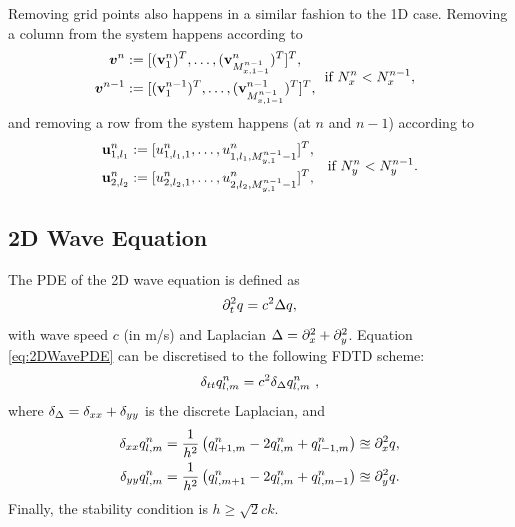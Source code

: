 \documentclass[fleqn]{jaes}
\begin{document}
Removing grid points also happens in a similar fashion to the 1D case. Removing a column from the system happens according to 
\begin{equation}
\begin{aligned}
    \!\!\!\!\vv^n &:= [(\v_1^n)^T, \hdots, (\v_{M_{x,1-1}^{n-1}}^n)^T]^T,\\
     \!\!\!\!\vv^{n-1} &:= [(\v_1^{n-1})^T, \hdots, (\v_{M_{x,1-1}^{n-1}}^{n-1})^T]^T,
    \end{aligned}
\ \ \text{if } N_x^n < N_x^{n-1},
\end{equation}
and removing a row from the system happens (at $n$ and $n-1$) according to
\begin{equation}
    \begin{aligned}
        \u_{1,l_1}^n &:= [u_{1,l_1, 1}^n, \hdots, u_{1,l_1, M_{y,1}^{n-1}-1}^n]^T,\\
        \u_{2,l_2}^n &:= [u_{2,l_2, 1}^n,\hdots, u^n_{2,l_2, M_{y, 1}^{n-1}-1}]^T,
    \end{aligned}\quad \text{if } N_y^n < N_y^{n-1}.
\end{equation}

\subsection{2D Wave Equation}
The PDE of the 2D wave equation is defined as
\begin{equation}\label{eq:2DWavePDE}
    \ptt q = c^2 \Delta q,
\end{equation}
with wave speed $c$ (in m/s) and Laplacian $\Delta = \partial_x^2 + \partial_y^2$. Equation \eqref{eq:2DWavePDE} can be discretised to the following FDTD scheme:
\begin{equation}\label{eq:2DWaveFDS}
    \dtt \qlmn = c^2 \dDelta \qlmn\ ,
\end{equation}
where $\delta_{\Delta} = \delta_{xx} + \delta_{yy}$ is the discrete Laplacian, and 
\begin{subequations}
\begin{align}
    \delta_{xx} q_{l,m}^n &= \frac{1}{h^2}\left(q_{l+1,m}^n - 2 q_{l,m}^n + q_{l-1,m}^n\right)\approxeq \partial_x^2 q,\\
    \delta_{yy} q_{l,m}^n &= \frac{1}{h^2}\left(q_{l,m+1}^n - 2 q_{l,m}^n + q_{l,m-1}^n\right)\approxeq \partial_y^2 q.
\end{align}
\end{subequations}
Finally, the stability condition is $h \geq \sqrt{2}c k$.
\end{document}
